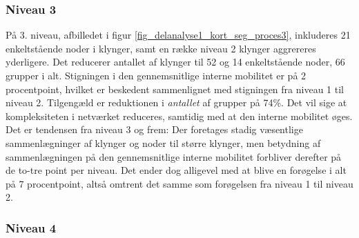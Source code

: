 \subsubsection{Niveau 3}


På 3. niveau, afbilledet i figur \ref{fig_delanalyse1_kort_seg_proces3}, inkluderes 21 enkeltstående noder i klynger, samt en række niveau 2 klynger aggrereres yderligere. Det reducerer antallet af klynger til 52 og 14 enkeltstående noder, 66 grupper i alt. Stigningen i den gennemsnitlige interne mobilitet er på 2 procentpoint, hvilket er beskedent sammenlignet med stigningen fra niveau 1 til niveau 2. Tilgengæld er reduktionen i \emph{antallet} af grupper på 74\%. Det vil sige at kompleksiteten i netværket reduceres, samtidig med at den interne mobilitet øges. Det er tendensen fra niveau 3 og frem: Der foretages stadig væsentlige sammenlægninger af klynger og noder til større klynger, men betydning af sammenlægningen på den gennemsnitlige interne mobilitet forbliver derefter på de to-tre point per niveau. Det ender dog alligevel med at blive en forøgelse i alt på 7 procentpoint, altså omtrent det samme som forøgelsen fra niveau 1 til niveau 2. 



\subsubsection{Niveau 4}


